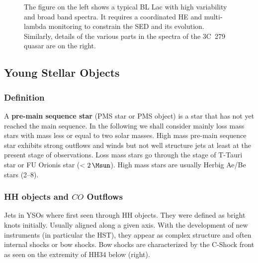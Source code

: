 \documentclass[10pt,a4paper,english]{article}
\begin{document}
\begin{figure}[!ht]
    \noindent
    \begin{subfigure}[t]{.495\textwidth}
    \end{subfigure}%
    \hfill
    \begin{subfigure}[t]{.495\textwidth}
    \end{subfigure}
    \caption{
        The figure on the left shows a typical BL Lac with high variability and
        broad band spectra. It requires a coordinated HE and multi-lambda
        monitoring to constrain the SED and its evolution. Similarly, details
        of the various parts in the spectra of the 3C~279 quasar are on the
        right.
    }
\end{figure}

\subsection{Young Stellar Objects}

\subsubsection{Definition}

A \textbf{pre-main sequence star} (PMS star or PMS object) is a star that has
not yet reached the main sequence. In the following we shall consider mainly
loss mass stars with mass less or equal to two solar masses. High mass pre-main
sequence star exhibits strong outflows and winds but not well structure jets at
least at the present stage of observations. Loss mass stars go through the
stage of T-Tauri star or FU Orionis star ($<\SI{2}{\Msun}$). High mass stars
are usually Herbig Ae/Be stars (\SIrange{2}{8}{\Msun}).

\subsubsection{\texorpdfstring{HH objects and $CO$ Outflows}{HH objects and CO Outflows}}

Jets in YSOs where first seen through HH objects. They were defined as bright
knots initially. Usually aligned along a given axis. With the development of
new instruments (in particular the HST), they appear as complex structure and
often internal shocks or bow shocks. Bow shocks are characterized by the
C-Shock front as seen on the extremity of HH34 below (right).
\end{document}
